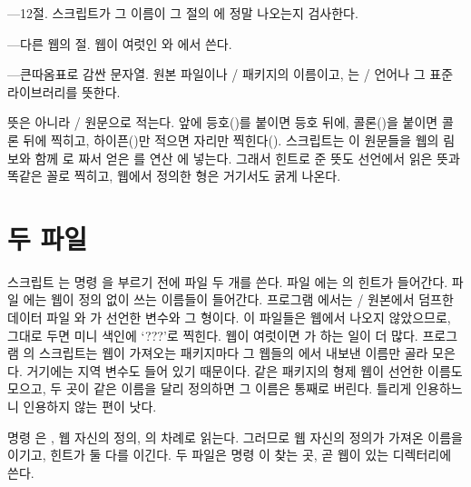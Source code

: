 \bull {}---12절. 스크립트가 그 이름이 그 절의 에 정말 나오는지
검사한다.

\bull {}---다른 웹의 절. 웹이 여럿인 와 에서 쓴다.

\bull {}---큰따옴표로 감싼 문자열. 원본 파일이나 \GO/ 패키지의
이름이고, 는 \CEE/ 언어나 그 표준 라이브러리를 뜻한다.

\noindent 뜻은  아니라 \GO/ 원문으로 적는다. 앞에 등호(\cw{=})를 붙이면 등호
뒤에, 콜론(\cw{:})을 붙이면 콜론 뒤에 찍히고, 하이픈(\cw{-})만 적으면 자리만
찍힌다(). 스크립트는 이 원문들을 웹의 림보와 함께 로 짜서 얻은
를 연산 에 넣는다. 그래서 힌트로 준 뜻도 선언에서 읽은
뜻과 똑같은 꼴로 찍히고, 웹에서 정의한 형은 거기서도 굵게 나온다.

\section{두  파일}
스크립트 는 명령 을 부르기 전에  파일 두 개를 쓴다.
파일 에는 의 힌트가 들어간다. 파일 에는
웹이 정의 없이 쓰는 이름들이 들어간다. 프로그램 에서는 \CEE/ 원본에서
덤프한 데이터 파일 와 가 선언한 변수와 그 형이다.
이 파일들은 웹에서 나오지 않았으므로, 그대로 두면 미니 색인에 `???'로 찍힌다.
웹이 여럿이면 가 하는 일이 더 많다. 프로그램 의
스크립트는 웹이 가져오는 패키지마다 그 웹들의 에서 내보낸 이름만 골라
모은다. 거기에는 지역 변수도 들어 있기 때문이다. 같은 패키지의 형제 웹이 선언한
이름도 모으고, 두 곳이 같은 이름을 달리 정의하면 그 이름은 통째로 버린다. 틀리게
인용하느니 인용하지 않는 편이 낫다.

명령 은 , 웹 자신의 정의, 의 차례로 읽는다.
그러므로 웹 자신의 정의가 가져온 이름을 이기고, 힌트가 둘 다를 이긴다. 두 파일은
명령 이 찾는 곳, 곧 웹이 있는 디렉터리에 쓴다.

